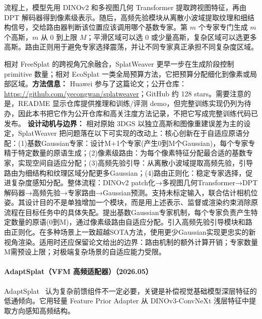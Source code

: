 流程上，模型先用 DINOv2 和多视图几何 Transformer 提取跨视图特征，再由 DPT 解码器得到像素级表示。随后，高频先验模块从离散小波域提取纹理和细结构信号，交给路由器判断该位置应该调用哪个基数专家。第 $m$ 个专家专门生成 $m$ 个高斯，$m$ 从 0 到上限 $M$；平滑区域可以选 0 或少量高斯，复杂区域可以选更多高斯。路由正则用于避免专家选择震荡，并让不同专家真正承担不同复杂度区域。

相对 FreeSplat 的跨视角冗余融合，SplatWeaver 更早一步在生成阶段控制 primitive 数量；相对 EcoSplat 一类全局预算方法，它把预算分配细化到像素或局部区域。\textbf{方法信息：} Huawei 参与了这篇论文；公开仓库：\url{https://github.com/yecongwan/splatweaver}；GitHub 约 128 stars。需要注意的是，README 显示仓库提供推理和训练/评测 demo，但完整训练实现仍列为待办，因此本书把它作为公开仓库和高关注度方法记录，不把它写成完整训练代码已发布。
\textbf{设计动机与边界：} 相对原始 3DGS 以独立高斯和图像重建误差为主的设定，SplatWeaver 把问题落在以下可实现的改动上：核心创新在于自适应原语分配：(1)基数Gaussian专家：设计M+1个专家(产生0到M个Gaussian)，每个专家专精于特定数量的原语生成；(2)像素级路由：为每个像素特征分配最合适的基数专家，实现空间自适应分配；(3)高频先验引导：从离散小波域提取高频先验，引导路由为细结构和纹理区域分配更多Gaussian；(4)路由正则化：稳定专家选择，促进复杂度感知分配。整体流程：DINOv2 patch化→多视图几何Transformer→DPT解码器→高频先验→专家路由→Gaussian预测。支持未标定输入，联合估计相机位姿。其设计目的不是单独增加一个模块，而是用上述表示、监督或渲染约束消除原流程在目标任务中的具体失配。提出基数Gaussian专家机制，每个专家负责产生特定数量的原语(0到M)，通过像素级路由自适应分配。引入高频先验引导模块和路由正则化。在多种场景上一致超越SOTA方法，使用更少Gaussian实现更忠实的新视角渲染。适用时还应保留论文给出的边界：路由机制的额外计算开销；专家数量M需预设上限；对极端复杂场景的自适应能力受限。
\paragraph{AdaptSplat（VFM 高频适配器）（2026.05）}
AdaptSplat~\cite{2605_10239} 认为复杂前馈组件不一定必要，关键是补偿视觉基础模型深层特征的低通倾向。它用轻量 Feature Prior Adapter 从 DINOv3-ConvNeXt 浅层特征中提取方向感知高频结构。

